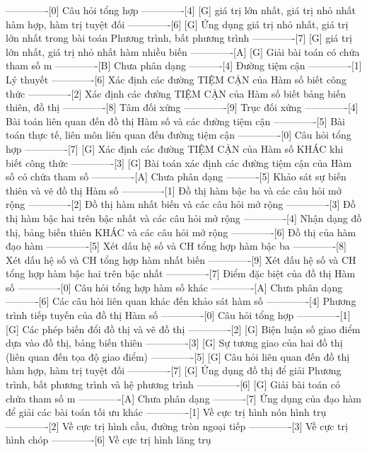 -------------[0] Câu hỏi tổng hợp
-------------[4] [G] giá trị lớn nhất, giá trị nhỏ nhất hàm hợp, hàm trị tuyệt đối
-------------[6] [G] Ứng dụng giá trị nhỏ nhất, giá trị lớn nhất trong bài toán Phương trình, bất phương trình 
-------------[7] [G] giá trị lớn nhất, giá trị nhỏ nhất hàm nhiều biến
-------------[A] [G] Giải bài toán có chứa tham số m
-------------[B] Chưa phân dạng
----------[4] Đường tiệm cận
-------------[1] Lý thuyết
-------------[6] Xác định các đường TIỆM CẬN của Hàm số biết công thức
-------------[2] Xác định các đường TIỆM CẬN của Hàm số biết bảng biến thiên, đồ thị
-------------[8] Tâm đối xứng
-------------[9] Trục đối xứng
-------------[4] Bài toán liên quan đến đồ thị Hàm số và các đường tiệm cận
-------------[5] Bài toán thực tế, liên môn liên quan đến đường tiệm cận
-------------[0] Câu hỏi tổng hợp
-------------[7] [G] Xác định các đường TIỆM CẬN của Hàm số KHÁC khi biết công thức
-------------[3] [G] Bài toán xác định các đường tiệm cận của Hàm số có chứa tham số
-------------[A] Chưa phân dạng
----------[5] Khảo sát sự biến thiên và vẽ đồ thị Hàm số
-------------[1] Đồ thị hàm bậc ba và các câu hỏi mở rộng
-------------[2] Đồ thị hàm nhất biến và các câu hỏi mở rộng
-------------[3] Đồ thị hàm bậc hai trên bậc nhất và các câu hỏi mở rộng
-------------[4] Nhận dạng đồ thị, bảng biến thiên KHÁC và các câu hỏi mở rộng
-------------[6] Đồ thị của hàm đạo hàm
-------------[5] Xét dấu hệ số và CH tổng hợp hàm bậc ba
-------------[8] Xét dấu hệ số và CH tổng hợp hàm nhất biến
-------------[9] Xét dấu hệ số và CH tổng hợp hàm bậc hai trên bậc nhất
-------------[7] Điểm đặc biệt của đồ thị Hàm số
-------------[0] Câu hỏi tổng hợp hàm số khác
-------------[A] Chưa phân dạng
----------[6] Các câu hỏi liên quan khác đến khảo sát hàm số
-------------[4] Phương trình tiếp tuyến của đồ thị Hàm số
-------------[0] Câu hỏi tổng hợp
-------------[1] [G] Các phép biến đổi đồ thị và vẽ đồ thị
-------------[2] [G] Biện luận số giao điểm dựa vào đồ thị, bảng biến thiên
-------------[3] [G] Sự tương giao của hai đồ thị (liên quan đến tọa độ giao điểm)
-------------[5] [G] Câu hỏi liên quan đến đồ thị hàm hợp, hàm trị tuyệt đối
-------------[7] [G] Ứng dụng đồ thị để giải Phương trình, bất phương trình và hệ phương trình
-------------[6] [G] Giải bài toán có chứa tham số m
-------------[A] Chưa phân dạng
----------[7] Ứng dụng của đạo hàm để giải các bài toán tối ưu khác
-------------[1] Về cực trị hình nón hình trụ
-------------[2] Về cực trị hình cầu, đường tròn ngoại tiếp 
-------------[3] Về cực trị hình chóp
-------------[6] Về cực trị hình lăng trụ
